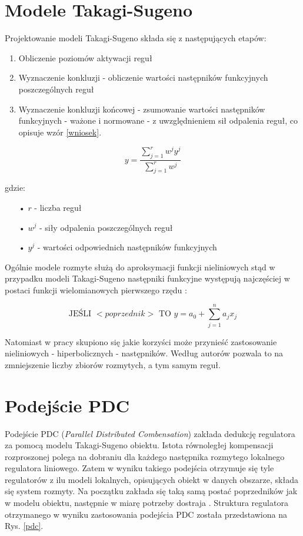 \section{Modele Takagi-Sugeno}
Projektowanie modeli Takagi-Sugeno składa się z następujących etapów:

\begin{enumerate}
\item Obliczenie poziomów aktywacji reguł
\item Wyznaczenie konkluzji - obliczenie wartości następników funkcyjnych poszczególnych reguł
\item Wyznaczenie konkluzji końcowej - zsumowanie wartości następników funkcyjnych - ważone i normowane - z uwzględnieniem sił odpalenia reguł, co opisuje wzór \ref{wniosek}.
\end{enumerate}

\begin{equation}
y = \frac{\sum_{j=1}^r w^j y^j}{\sum_{j=1}^r w^j}
\label{wniosek}
\end{equation}

\noindent gdzie:
\begin{itemize}
\item[•] $r$ - liczba reguł
\item[•] $w^j$ - siły odpalenia poszczególnych reguł
\item[•] $y^j$ - wartości odpowiednich następników funkcyjnych
\end{itemize}

Ogólnie modele rozmyte służą do aproksymacji funkcji nieliniowych stąd w przypadku modeli Takagi-Sugeno następniki funkcyjne występują najczęściej w postaci funkcji wielomianowych pierwszego rzędu \cite{160, 170}:

\begin{equation}
\text{JEŚLI } <poprzednik> \text{ TO } y = a_0 + \sum_{j=1}^n a_jx_j
\end{equation} 

Natomiast w pracy skupiono się jakie korzyści może przynieść zastosowanie nieliniowych - hiperbolicznych - następników. Według autorów \cite{80} pozwala to na zmniejszenie liczby zbiorów rozmytych, a tym samym reguł.

\newpage

\section{Podejście PDC}
Podejście PDC (\textit{Parallel Distributed Combensation}) zakłada dedukcję regulatora za pomocą modelu Takagi-Sugeno obiektu. Istota równoległej kompensacji rozproszonej polega na dobraniu dla każdego następnika rozmytego lokalnego regulatora liniowego. Zatem w wyniku takiego podejścia otrzymuje się tyle regulatorów z ilu modeli lokalnych, opisujących obiekt w danych obszarze, składa się system rozmyty. Na początku zakłada się taką samą postać poprzedników jak w modelu obiektu, następnie w miarę potrzeby dostraja \cite{120, 170}. Struktura regulatora otrzymanego w wyniku zastosowania podejścia PDC została przedstawiona na Rys. \ref{pdc}.

